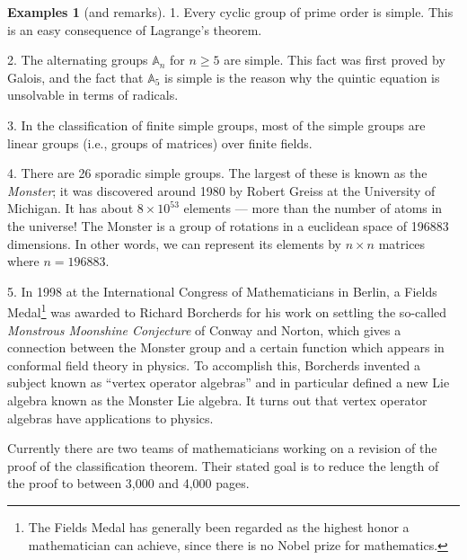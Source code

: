 \documentclass[11pt,oneside]{article}
\theoremstyle{definition}
\newtheorem{examples}[thm]{Examples}
\newcommand{\Alt}{\mathbb{A}}
\begin{document}
\begin{examples}[and remarks]
1. Every cyclic group of prime order is simple. This is an easy
consequence of Lagrange's theorem.

2. The alternating groups $\Alt_n$ for $n \ge 5$ are simple. This fact
was first proved by Galois, and the fact that $\Alt_5$ is simple is the
reason why the quintic equation is unsolvable in terms of radicals.

3. In the classification of finite simple groups, most of the simple
groups are linear groups (i.e., groups of matrices) over finite
fields.


4. There are 26 sporadic simple groups. The largest of these is known
as the \emph{Monster}; it was discovered around
1980 by Robert Greiss at the University of Michigan. It has about
$8\times 10^{53}$ elements --- more than the number of atoms in the
universe!  The Monster is a group of rotations in a euclidean space of
196883 dimensions. In other words, we can represent its elements by
$n \times n$ matrices where $n=196883$.

5. In 1998 at the International Congress of Mathematicians in Berlin,
a Fields Medal\footnote{The Fields Medal has generally been regarded
  as the highest honor a mathematician can achieve, since there is no
  Nobel prize for mathematics.} was awarded to Richard Borcherds for
his work on settling the so-called {\em Monstrous Moonshine
  Conjecture} of Conway and Norton, which gives a connection between
the Monster group and a certain function which appears in conformal
field theory in physics. To accomplish this, Borcherds invented a
subject known as ``vertex operator algebras'' and in particular
defined a new Lie algebra known as the Monster Lie algebra. It turns
out that vertex operator algebras have applications to physics.
\end{examples}

Currently there are two teams of mathematicians working on a revision
of the proof of the classification theorem. Their stated goal is to
reduce the length of the proof to between 3,000 and 4,000 pages.



\renewcommand{\thesection}{\arabic{section}}
\end{document}
